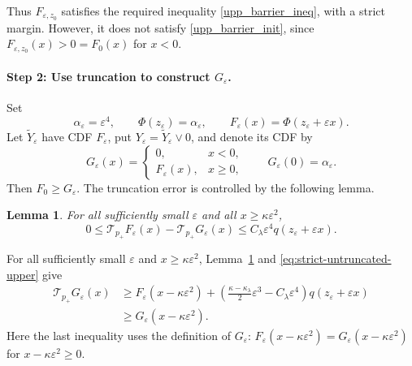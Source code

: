 \documentclass[12pt]{amsart}
\numberwithin{equation}{section}
\theoremstyle{plain}
\newtheorem{lemma}[theorem]{Lemma}
\theoremstyle{definition}
\begin{document}
Thus $F_{\varepsilon,z_0}$ satisfies the required inequality \eqref{upp_barrier_ineq}, with a
strict margin.  However, it does not satisfy \eqref{upp_barrier_init}, since
$F_{\varepsilon,z_0}(x)>0=F_0(x)$ for $x<0$.

\paragraph*{Step 2: Use truncation to construct $G_\varepsilon$.}
Set
\begin{equation*}
 \alpha_\varepsilon=\varepsilon^4,
 \qquad
 \Phi(z_\varepsilon)=\alpha_\varepsilon,
 \qquad
 F_\varepsilon(x)=\Phi(z_\varepsilon+\varepsilon x).
\end{equation*}
Let $\widetilde Y_\varepsilon$ have CDF $F_\varepsilon$, put $Y_\varepsilon=\widetilde Y_\varepsilon\vee0$, and denote its
CDF by
\begin{equation*}
 G_\varepsilon(x)=
 \begin{cases}
 0,&x<0,\\
 F_\varepsilon(x),&x\ge0,
 \end{cases}
 \qquad G_\varepsilon(0)=\alpha_\varepsilon.
\end{equation*}
Then $F_0\ge G_\varepsilon$.  The truncation error is controlled by the
following lemma.

\begin{lemma}
\label{lem:upper-cutoff-error}
For all sufficiently small $\varepsilon$ and all
$x\ge\kappa\varepsilon^2$,
\begin{equation}
 0\le
 \mathcal T_{p_+}F_\varepsilon(x)
 -\mathcal T_{p_+}G_\varepsilon(x)
 \le C_{\lambda}\varepsilon^4q(z_\varepsilon+\varepsilon x).
 \label{eq:upper-operator-cutoff-error}
\end{equation}
\end{lemma}

For all sufficiently small $\varepsilon$ and
$x\ge\kappa\varepsilon^2$, Lemma~\ref{lem:upper-cutoff-error} and
\eqref{eq:strict-untruncated-upper} give
\[
\begin{aligned}
 \mathcal T_{p_+}G_\varepsilon(x)
 &\ge F_\varepsilon(x-\kappa\varepsilon^2)+\left(
     \frac{\kappa-\kappa_{\lambda}}2\varepsilon^3
     -C_{\lambda}\varepsilon^4
   \right)q(z_\varepsilon+\varepsilon x)\\
 &\ge G_\varepsilon(x-\kappa\varepsilon^2).
\end{aligned}
\]
Here the last inequality uses the definition of $G_\varepsilon$:
\(
 F_\varepsilon(x-\kappa\varepsilon^2)
 =G_\varepsilon(x-\kappa\varepsilon^2)
\)
for $x-\kappa\varepsilon^2\ge0.$
\end{document}
